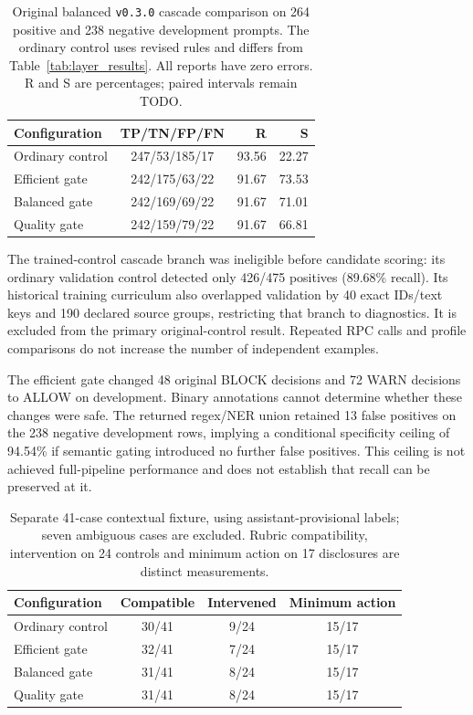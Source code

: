 \documentclass[conference]{IEEEtran}
\begin{document}
\begin{table}[t]
\centering
\caption{Original balanced \texttt{v0.3.0} cascade comparison on 264 positive and 238 negative development prompts. The ordinary control uses revised rules and differs from Table~\ref{tab:layer_results}. All reports have zero errors. R and S are percentages; paired intervals remain TODO.}
\label{tab:cascade_results}
\small
\setlength{\tabcolsep}{4pt}
\begin{tabular}{lcrr}
\hline
Configuration & TP/TN/FP/FN & R & S \\
\hline
Ordinary control & 247/53/185/17 & 93.56 & 22.27 \\
Efficient gate & 242/175/63/22 & 91.67 & 73.53 \\
Balanced gate & 242/169/69/22 & 91.67 & 71.01 \\
Quality gate & 242/159/79/22 & 91.67 & 66.81 \\
\hline
\end{tabular}
\end{table}

The trained-control cascade branch was ineligible before candidate scoring: its ordinary validation control detected only 426/475 positives (89.68\% recall). Its historical training curriculum also overlapped validation by 40 exact IDs/text keys and 190 declared source groups, restricting that branch to diagnostics. It is excluded from the primary original-control result. Repeated RPC calls and profile comparisons do not increase the number of independent examples.

The efficient gate changed 48 original BLOCK decisions and 72 WARN decisions to ALLOW on development. Binary annotations cannot determine whether these changes were safe. The returned regex/NER union retained 13 false positives on the 238 negative development rows, implying a conditional specificity ceiling of 94.54\% if semantic gating introduced no further false positives. This ceiling is not achieved full-pipeline performance and does not establish that recall can be preserved at it.

\begin{table}[t]
\centering
\caption{Separate 41-case contextual fixture, using assistant-provisional labels; seven ambiguous cases are excluded. Rubric compatibility, intervention on 24 controls and minimum action on 17 disclosures are distinct measurements.}
\label{tab:fixture_results}
\small
\setlength{\tabcolsep}{3pt}
\begin{tabular}{lccc}
\hline
Configuration & Compatible & Intervened & Minimum action \\
\hline
Ordinary control & 30/41 & 9/24 & 15/17 \\
Efficient gate & 32/41 & 7/24 & 15/17 \\
Balanced gate & 31/41 & 8/24 & 15/17 \\
Quality gate & 31/41 & 8/24 & 15/17 \\
\hline
\end{tabular}
\end{table}
\end{document}
